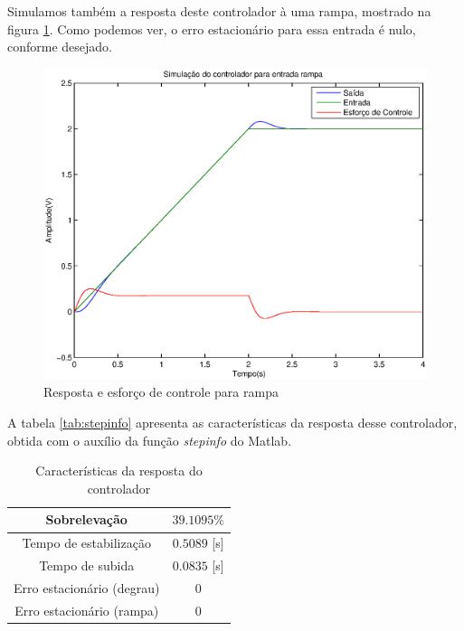 \documentclass{article}
\begin{document}
Simulamos também a resposta deste controlador à uma rampa, mostrado na figura \ref{fig:yurR}. Como podemos ver, o erro estacionário para essa entrada é nulo, conforme desejado.
\begin{figure}[H]
	\centering
	\includegraphics[width=0.8\linewidth]{../yurR}
	\caption{Resposta e esforço de controle para rampa}
	\label{fig:yurR}
\end{figure}
A tabela \ref{tab:stepinfo} apresenta as características da resposta desse controlador, obtida com o auxílio da função \textit{stepinfo} do Matlab.
\begin{table}[H]
	\centering
	\caption{Características da resposta do controlador}
	\label{tab:avat}
	\begin{tabular}{|c|c|}
		\hline Sobrelevação 				& $39.1095\%$ \\ 
		\hline Tempo de estabilização 		& $0.5089$ [s]\\ 
		\hline Tempo de subida				& $0.0835$ [s]\\ 
		\hline Erro estacionário (degrau) 	& $0$\\ 
		\hline Erro estacionário (rampa) 	& $0$\\ 
		\hline 
	\end{tabular} 
\end{table}
\begin{thebibliography}{widestlabel}
\end{thebibliography}
\end{document}

